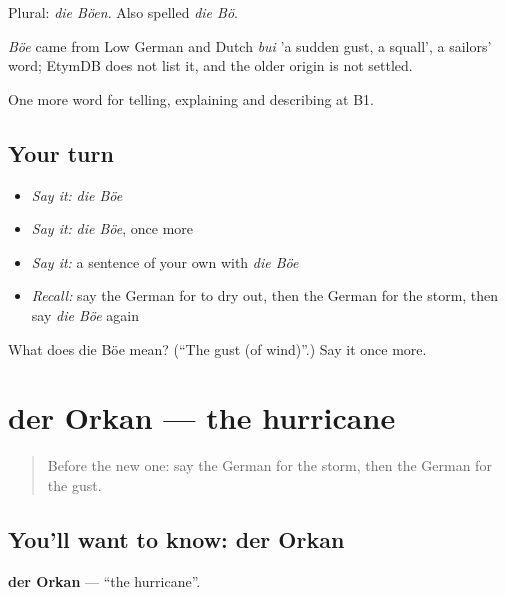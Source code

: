 Plural: \emph{die Böen}. Also spelled \emph{die Bö}.

\begin{cousinweb}
\emph{Böe} came from Low German and Dutch \emph{bui} 'a sudden gust, a squall', a sailors' word; EtymDB does not list it, and the older origin is not settled.
\end{cousinweb}

\begin{grammarlens}[title={What you've built}]
One more word for telling, explaining and describing at B1.
\end{grammarlens}

\subsection*{Your turn}
\begin{itemize}
\raggedright
  \item \emph{Say it:} \emph{die Böe}
  \item \emph{Say it:} \emph{die Böe}, once more
  \item \emph{Say it:} a sentence of your own with \emph{die Böe}
  \item \emph{Recall:} say the German for to dry out, then the German for the storm, then say \emph{die Böe} again
\end{itemize}

\begin{tcolorbox}[breakable,colback=teal!4,colframe=teal!35!black,title={Before you move on}]
What does die Böe mean? (\textquotedblleft{}The gust (of wind)\textquotedblright{}.) Say it once more.
\end{tcolorbox}
\section[der Orkan]{der Orkan — the hurricane}

\label{lesson:GE-C465-orkan}



\begin{quote}
Before the new one: say the German for the storm, then the German for the gust.
\end{quote}

\subsection*{You'll want to know: der Orkan}
\textbf{der Orkan} — \textquotedblleft{}the hurricane\textquotedblright{}.

